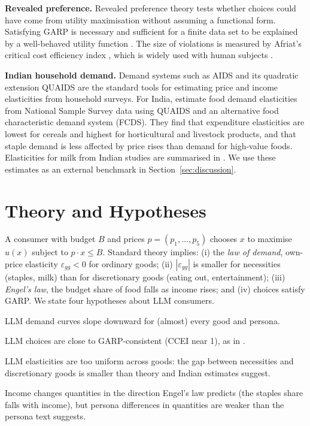 \documentclass[11pt,a4paper]{article}
\begin{document}
\textbf{Revealed preference.} Revealed preference theory \citep{samuelson1938} tests whether choices could have come from utility maximisation without assuming a functional form. Satisfying GARP is necessary and sufficient for a finite data set to be explained by a well-behaved utility function \citep{afriat1967,varian1982}. The size of violations is measured by Afriat's critical cost efficiency index \citep{afriat1973,varian1990}, which is widely used with human subjects \citep{andreoni2002,choi2014}.

\textbf{Indian household demand.} Demand systems such as AIDS \citep{deaton1980} and its quadratic extension QUAIDS \citep{banks1997} are the standard tools for estimating price and income elasticities from household surveys. For India, \citet{kumar2011} estimate food demand elasticities from National Sample Survey data using QUAIDS and an alternative food characteristic demand system (FCDS). They find that expenditure elasticities are lowest for cereals and highest for horticultural and livestock products, and that staple demand is less affected by price rises than demand for high-value foods. Elasticities for milk from Indian studies are summarised in \citet{nddbmilk}. We use these estimates as an external benchmark in Section~\ref{sec:discussion}.

\section{Theory and Hypotheses}
A consumer with budget $B$ and prices $p=(p_1,\dots,p_5)$ chooses $x$ to maximise $u(x)$ subject to $p\cdot x\le B$. Standard theory implies: (i) the \emph{law of demand}, own-price elasticity $\varepsilon_{gg}<0$ for ordinary goods; (ii) $|\varepsilon_{gg}|$ is smaller for necessities (staples, milk) than for discretionary goods (eating out, entertainment); (iii) \emph{Engel's law}, the budget share of food falls as income rises; and (iv) choices satisfy GARP. We state four hypotheses about LLM consumers.
\begin{description}\setlength\itemsep{0pt}
\item[H1] LLM demand curves slope downward for (almost) every good and persona.
\item[H2] LLM choices are close to GARP-consistent (CCEI near 1), as in \citet{chen2023}.
\item[H3] LLM elasticities are too uniform across goods: the gap between necessities and discretionary goods is smaller than theory and Indian estimates suggest.
\item[H4] Income changes quantities in the direction Engel's law predicts (the staples share falls with income), but persona differences in quantities are weaker than the persona text suggests.
\end{description}
\end{document}
